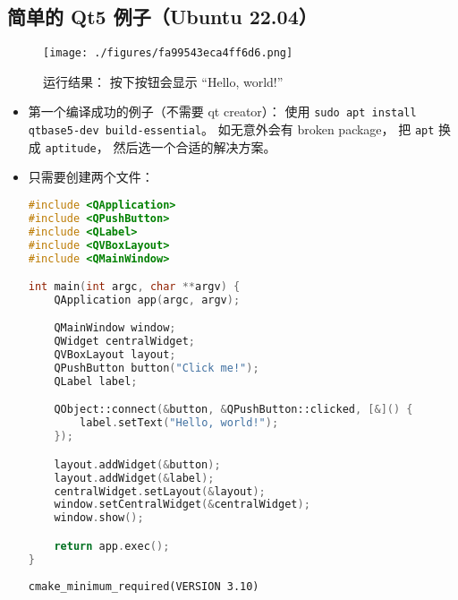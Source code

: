 \subsection{简单的 Qt5 例子（Ubuntu 22.04）}
\begin{figure}[ht]
\centering
\texttt{[image: ./figures/fa99543eca4ff6d6.png]}
\caption{运行结果： 按下按钮会显示 “Hello, world!”} \label{fig_QtInt1}
\end{figure}

\begin{itemize}
\item 第一个编译成功的例子（不需要 qt creator）： 使用 \verb|sudo apt install qtbase5-dev build-essential|。 如无意外会有 broken package， 把 \verb|apt| 换成 \verb|aptitude|， 然后选一个合适的解决方案。
\item 只需要创建两个文件：
\begin{lstlisting}[language=cpp,caption=main.cpp]
#include <QApplication>
#include <QPushButton>
#include <QLabel>
#include <QVBoxLayout>
#include <QMainWindow>

int main(int argc, char **argv) {
    QApplication app(argc, argv);

    QMainWindow window;
    QWidget centralWidget;
    QVBoxLayout layout;
    QPushButton button("Click me!");
    QLabel label;

    QObject::connect(&button, &QPushButton::clicked, [&]() {
        label.setText("Hello, world!");
    });

    layout.addWidget(&button);
    layout.addWidget(&label);
    centralWidget.setLayout(&layout);
    window.setCentralWidget(&centralWidget);
    window.show();

    return app.exec();
}
\end{lstlisting}
\begin{lstlisting}[language=none,caption=CMakeLists.txt]
cmake_minimum_required(VERSION 3.10)


\end{lstlisting}
\end{itemize}
